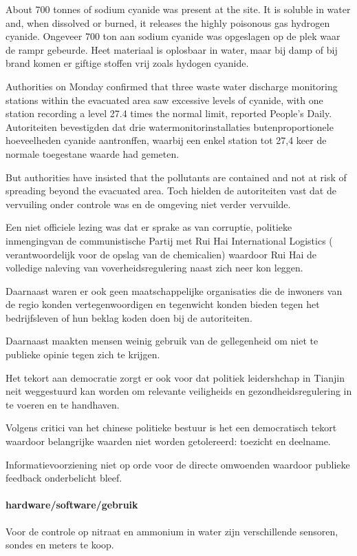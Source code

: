 \documentclass{article}
\begin{document}
About 700 tonnes of sodium cyanide was present at the site. It is soluble in water and, when dissolved or burned, it releases the highly poisonous gas hydrogen cyanide. Ongeveer  700 ton aan sodium cyanide was opgeslagen op de plek waar de rampr gebeurde. Heet materiaal is oplosbaar in water, maar bij damp of bij brand komen er giftige stoffen vrij zoals hydogen cyanide.

Authorities on Monday confirmed that three waste water discharge monitoring stations within the evacuated area saw excessive levels of cyanide, with one station recording a level 27.4 times the normal limit, reported People's Daily. Autoriteiten bevestigden dat drie watermonitorinstallaties butenproportionele hoeveelheden cyanide aantronffen, waarbij een enkel station tot 27,4 keer de normale toegestane waarde had gemeten.

But authorities have insisted that the pollutants are contained and not at risk of spreading beyond the evacuated area. Toch hielden de autoriteiten vast dat de vervuiling onder controle was en de omgeving niet verder vervuilde.

Een niet  officiele lezing  was dat er sprake as van corruptie, politieke inmengingvan de communistische Partij met Rui Hai International Logistics ( verantwoordelijk voor de opslag van de chemicalien) waardoor Rui Hai de volledige naleving van voverheidsregulering naast zich neer kon leggen.

Daarnaast waren er ook geen maatschappelijke organisaties die de inwoners van de regio konden vertegenwoordigen en tegenwicht konden bieden tegen het bedrijfsleven of hun beklag koden doen bij de autoriteiten.

Daarnaast maakten mensen  weinig gebruik van de gellegenheid om niet te  publieke opinie tegen zich te krijgen.

Het tekort aan democratie zorgt er ook voor dat politiek leidershchap in Tianjin neit weggestuurd kan worden om relevante veiligheids en gezondheidsregulering in te voeren en te  handhaven.

Volgens critici van het chinese politieke bestuur is het een democratisch tekort waardoor belangrijke waarden niet worden getolereerd: toezicht en deelname.

Informatievoorziening niet op orde voor de directe omwoenden waardoor publieke feedback onderbelicht bleef.

\paragraph{hardware/software/gebruik}
Voor de controle op nitraat en ammonium in water zijn verschillende sensoren, sondes en meters  te koop.
\end{document}
